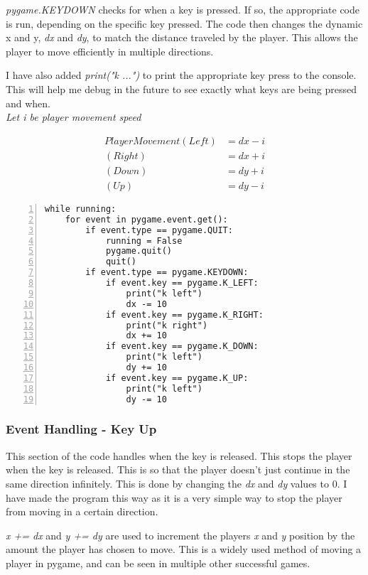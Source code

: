 \documentclass[12pt]{report}
\begin{document}
\textit{pygame.KEYDOWN} checks for when a key is pressed. If so, the appropriate code is run, depending on the specific key pressed. The code then changes the dynamic x and y, \textit{dx} and \textit{dy}, to match the distance traveled by the player. This allows the player to move efficiently in multiple directions. 

I have also added \textit{print("k ...")} to print the appropriate key press to the console. This will help me debug in the future to see exactly what keys are being pressed and when.\\

\textit{Let i be player movement speed}

\begin{align}
    Player Movement (Left) &= dx - i\\
    (Right)& = dx + i\\
    (Down) &= dy + i\\
    (Up) &= dy - i
\end{align}



\begin{Verbatim}[numbers=left, frame=single]
while running:
    for event in pygame.event.get():
        if event.type == pygame.QUIT:
            running = False
            pygame.quit()
            quit()
        if event.type == pygame.KEYDOWN:
            if event.key == pygame.K_LEFT:
                print("k left")
                dx -= 10
            if event.key == pygame.K_RIGHT:
                print("k right")
                dx += 10
            if event.key == pygame.K_DOWN:
                print("k left")
                dy += 10
            if event.key == pygame.K_UP:
                print("k left")
                dy -= 10
\end{Verbatim}

\pagebreak

\subsubsection{Event Handling - Key Up}
This section of the code handles when the key is released. This stops the player when the key is released. This is so that the player doesn't just continue in the same direction infinitely. This is done by changing the \textit{dx} and \textit{dy} values to 0. I have made the program this way as it is a very simple way to stop the player from moving in a certain direction.

\textit{x += dx} and \textit{y += dy} are used to increment the players \textit{x} and \textit{y} position by the amount the player has chosen to move. This is a widely used method of moving a player in pygame, and can be seen in multiple other successful games. 
\end{document}
